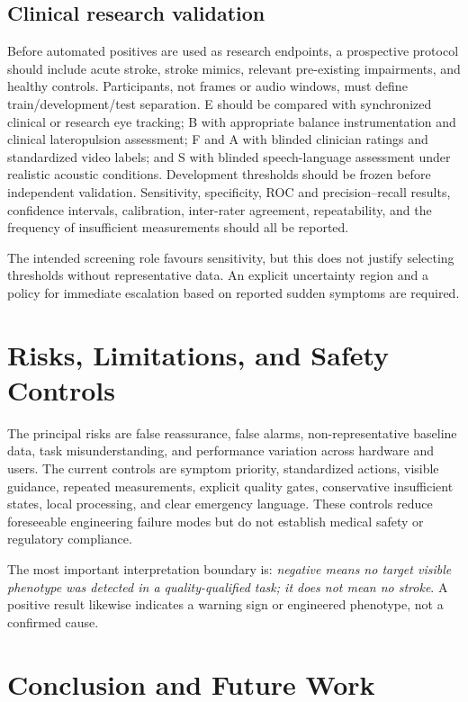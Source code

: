 \documentclass[11pt,a4paper]{article}
\begin{document}
\subsection{Clinical research validation}

Before automated positives are used as research endpoints, a prospective protocol should include acute stroke, stroke mimics, relevant pre-existing impairments, and healthy controls. Participants, not frames or audio windows, must define train/development/test separation. E should be compared with synchronized clinical or research eye tracking; B with appropriate balance instrumentation and clinical lateropulsion assessment; F and A with blinded clinician ratings and standardized video labels; and S with blinded speech-language assessment under realistic acoustic conditions. Development thresholds should be frozen before independent validation. Sensitivity, specificity, ROC and precision--recall results, confidence intervals, calibration, inter-rater agreement, repeatability, and the frequency of insufficient measurements should all be reported.

The intended screening role favours sensitivity, but this does not justify selecting thresholds without representative data. An explicit uncertainty region and a policy for immediate escalation based on reported sudden symptoms are required.

\section{Risks, Limitations, and Safety Controls}

The principal risks are false reassurance, false alarms, non-representative baseline data, task misunderstanding, and performance variation across hardware and users. The current controls are symptom priority, standardized actions, visible guidance, repeated measurements, explicit quality gates, conservative insufficient states, local processing, and clear emergency language. These controls reduce foreseeable engineering failure modes but do not establish medical safety or regulatory compliance.

The most important interpretation boundary is: \emph{negative means no target visible phenotype was detected in a quality-qualified task; it does not mean no stroke}. A positive result likewise indicates a warning sign or engineered phenotype, not a confirmed cause.

\section{Conclusion and Future Work}
\end{document}

